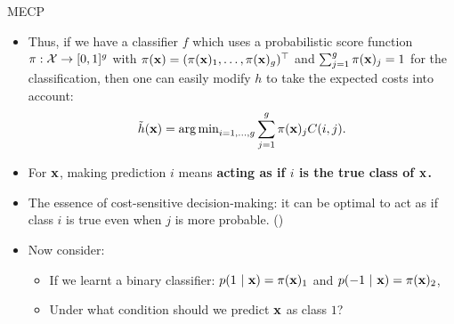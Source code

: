 \documentclass[11pt,compress,t,notes=noshow, xcolor=table]{beamer}
\begin{document}
\begin{vbframe}{MECP}
    \footnotesize
    \begin{itemize}
        \item Thus, if we have a classifier $f$ which uses a probabilistic score function $\pi:\mathcal{X} \to [0,1]^g$ with $\pi(\mathbf{x}) = (\pi(\mathbf{x})_1,\ldots,\pi(\mathbf{x})_g)^\top$ and $\sum_{j=1}^g \pi(\mathbf{x})_j = 1$ for the classification, then one can easily modify $h$ to take the expected costs into account:
		$$  \tilde h(\mathbf{x}) = \operatorname{arg\,min}_{i=1,\ldots,g} \sum_{j=1}^g 	\pi(\mathbf{x})_j C(i,j). $$
        \vspace{10pt}

        \item For $\mathbf{x}$, making prediction $i$ means \textbf{acting as if $i$ is the true class of $\mathbf{x}$.}
        \vspace{10pt}
        
        \item The essence of cost-sensitive decision-making: it can be optimal to act as if class $i$ is true even when $j$ is more probable. (\href{https://dl.acm.org/doi/10.5555/1642194.1642224}{})
        \vspace{10pt}

        \item Now consider: 
        \begin{itemize}
            \footnotesize
            \item If we learnt a binary classifier: $p(1 ~|~ \mathbf{x}) = \pi(\mathbf{x})_1$ and $p(-1 ~|~ \mathbf{x}) = \pi(\mathbf{x})_2$,
            \item Under what condition should we predict $\mathbf{x}$ as class $1$?
        \end{itemize}
    \end{itemize}
\end{vbframe}
\end{document}
